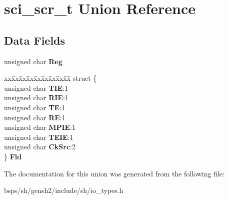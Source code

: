 \hypertarget{unionsci__scr__t}{}\section{sci\+\_\+scr\+\_\+t Union Reference}
\label{unionsci__scr__t}
\subsection*{Data Fields}
\begin{DoxyCompactItemize}
\item 
\mbox{\label{unionsci__scr__t_a5a88855166445d777da979c292053df3}} 
unsigned char {\bfseries Reg}
\item 
\mbox{\label{unionsci__scr__t_a217ab83025652e5bd5262715e0aa0ceb}} 
\begin{tabbing}
xx\=xx\=xx\=xx\=xx\=xx\=xx\=xx\=xx\=\kill
struct \{\\
\>unsigned char {\bfseries TIE}:1\\
\>unsigned char {\bfseries RIE}:1\\
\>unsigned char {\bfseries TE}:1\\
\>unsigned char {\bfseries RE}:1\\
\>unsigned char {\bfseries MPIE}:1\\
\>unsigned char {\bfseries TEIE}:1\\
\>unsigned char {\bfseries CkSrc}:2\\
\} {\bfseries Fld}\\

\end{tabbing}\end{DoxyCompactItemize}


The documentation for this union was generated from the following file\+:\begin{DoxyCompactItemize}
\item 
bsps/sh/gensh2/include/sh/io\+\_\+types.\+h\end{DoxyCompactItemize}
